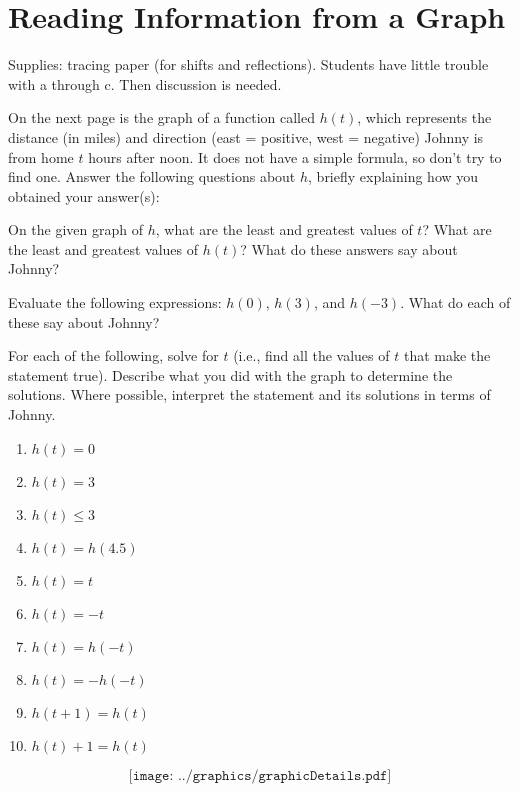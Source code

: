 \newpage
\section{Reading Information from a Graph}

\begin{teachingnote}
Supplies:  tracing paper (for shifts and reflections).  
Students have little trouble with a through c.  Then discussion is needed. 
\end{teachingnote}

On the next page is the graph of a function called $h(t)$, which
represents the distance (in miles) and direction (east = positive,
west = negative) Johnny is from home $t$ hours after noon. It does not
have a simple formula, so don't try to find one. Answer the following
questions about $h$, briefly explaining how you obtained your
answer(s):

\begin{prob}
On the given graph of $h$, what are the least and greatest values
of $t$? What are the least and greatest values of $h(t)$? What do
these answers say about Johnny?
\end{prob}

\begin{prob}
Evaluate the following expressions: $h(0)$, $h(3)$, and $h(-3)$. What
do each of these say about Johnny? 
\end{prob}

\begin{prob}
For each of the following, solve for $t$ (i.e., find all the values of
$t$ that make the statement true). Describe what you did with the
graph to determine the solutions.  Where possible, interpret
the statement and its solutions in terms of Johnny.

\begin{enumerate}
\item $h(t) = 0$
\item $h(t) = 3$
\item $h(t) \leq 3$
\item $h(t) = h(4.5)$
\item $h(t) = t$
\item $h(t) = -t$
\item $h(t) = h(-t)$
\item $h(t) = -h(-t)$
\item $h(t+1) = h(t)$
\item $h(t)+1 = h(t)$
\end{enumerate}
\end{prob}

\newpage

\[
\texttt{[image: ../graphics/graphicDetails.pdf]}
\]
